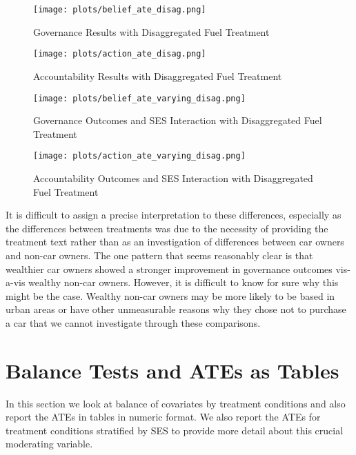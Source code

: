 \documentclass[12pt, letterpaper]{article}
\begin{document}
\begin{figure}
    \centering
    \caption{Governance Results with Disaggregated Fuel Treatment}
    \texttt{[image: plots/belief\_ate\_disag.png]}
    \label{belief_disag}
\end{figure}


\begin{figure}
    \centering
    \caption{Accountability Results with Disaggregated Fuel Treatment}
    \texttt{[image: plots/action\_ate\_disag.png]}
    \label{action_disag}
\end{figure}

\begin{figure}
    \centering
    \caption{Governance Outcomes and SES Interaction with Disaggregated Fuel Treatment}
    \texttt{[image: plots/belief\_ate\_varying\_disag.png]}
    \label{belief_ses_disag}
\end{figure}

\begin{figure}
    \centering
    \caption{Accountability Outcomes and SES Interaction with Disaggregated Fuel Treatment}
    \texttt{[image: plots/action\_ate\_varying\_disag.png]}
    \label{action_ses_disag}
\end{figure}

It is difficult to assign a precise interpretation to these differences, especially as the differences between treatments was due to the necessity of providing the treatment text rather than as an investigation of differences between car owners and non-car owners. The one pattern that seems reasonably clear is that wealthier car owners showed a stronger improvement in governance outcomes vis-a-vis wealthy non-car owners. However, it is difficult to know for sure why this might be the case. Wealthy non-car owners may be more likely to be based in urban areas or have other unmeasurable reasons why they chose not to purchase a car that we cannot investigate through these comparisons.

\newpage

\section{Balance Tests and ATEs as Tables}

In this section we look at balance of covariates by treatment conditions and also report the ATEs in tables in numeric format. We also report the ATEs for treatment conditions stratified by SES to provide more detail about this crucial moderating variable. 
\end{document}
